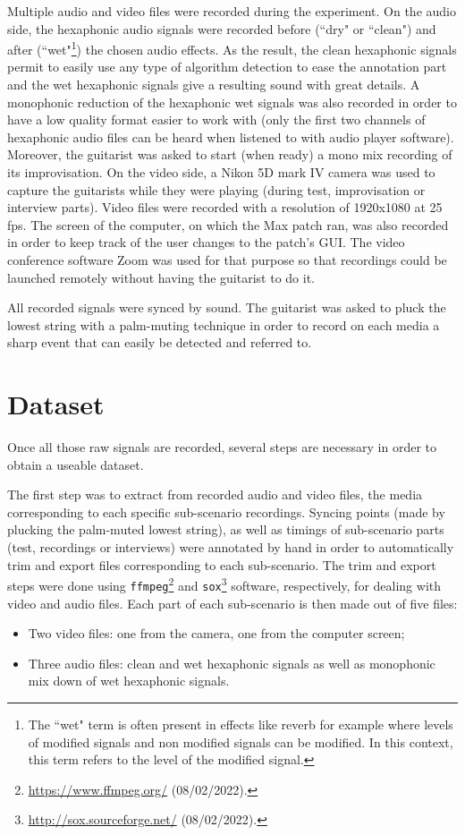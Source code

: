 \documentclass{article}
\begin{document}
Multiple audio and video files were recorded during the experiment. 
On the audio side, the hexaphonic audio signals were recorded before (``dry" or ``clean") and after \linebreak(``wet"\footnote{The ``wet" term is often present in effects like reverb for example where levels of modified signals and non modified signals can be modified. In this context, this term refers to the level of the modified signal.}) the chosen audio effects. As the result, the clean hexaphonic signals permit to easily use any type of algorithm detection to ease the annotation part and the wet hexaphonic signals give a resulting sound with great details. A monophonic reduction of the hexaphonic wet signals was also recorded in order to have a low quality format easier to work with (only the first two channels of hexaphonic audio files can be heard when listened to with audio player software).
Moreover, the guitarist was asked to start (when ready) a mono mix recording of its improvisation. 
On the video side, a Nikon 5D mark IV camera was used to capture the guitarists while they were playing (during test, improvisation or interview parts). Video files were recorded with a resolution of 1920x1080 at 25 fps. The screen of the computer, on which the Max patch ran, was also recorded in order to keep track of the user changes to the patch's GUI. The video conference software Zoom was used for that purpose so that recordings could be launched remotely without having the guitarist to do it.

All recorded signals were synced by sound. The guitarist was asked to pluck the lowest string with a palm-muting technique in order to record on each media a sharp event that can easily be detected and referred to.

\section{Dataset}\label{sec:dataset}
Once all those raw signals are recorded, several steps are necessary in order to obtain a useable dataset. 

The first step was to extract from recorded audio and video files, the media corresponding to each specific sub-scenario recordings. Syncing points (made by plucking the palm-muted lowest string), as well as timings of sub-scenario parts (test, recordings or interviews) were annotated by hand in order to automatically trim and export files corresponding to each sub-scenario. The trim and export steps were done using \texttt{ffmpeg}\footnote{\url{https://www.ffmpeg.org/} (08/02/2022).} and \texttt{sox}\footnote{\url{http://sox.sourceforge.net/} (08/02/2022).} software, respectively, for dealing with video and audio files. Each part of each sub-scenario is then made out of five files: 
\begin{itemize}
\item Two video files: one from the camera, one from the computer screen;
\item Three audio files: clean and wet hexaphonic signals as well as monophonic mix down of wet hexaphonic signals.
\end{itemize}  
\end{document}
